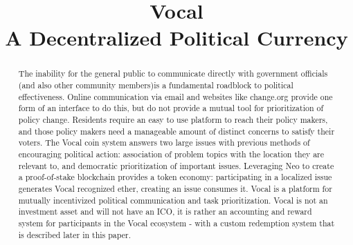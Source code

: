 \documentclass[conference]{IEEEtran}
\begin{document}
    \title{Vocal\\ A Decentralized Political Currency }
    
    \author{
    \and
    }

    \maketitle
    
    \begin{abstract}
      The inability for the general public to communicate directly with government officials (and also other community members)is a fundamental roadblock to political effectiveness. Online communication via email and websites like change.org provide one form of an interface to do this, but do not provide a mutual tool for prioritization of policy change. Residents require an easy to use platform to reach their policy makers, and those policy makers need a manageable amount of distinct concerns to satisfy their voters. The Vocal coin system answers two large issues with previous methods of encouraging political action: association of problem topics with the location they are relevant to, and democratic prioritization of important issues. Leveraging Neo to create a proof-of-stake blockchain provides a token economy: participating in a localized issue generates Vocal recognized ether, creating an issue consumes it. Vocal is a platform for mutually incentivized political communication and task prioritization. Vocal is not an investment asset and will not have an ICO, it is rather an accounting and reward system for participants in the Vocal ecosystem - with a custom redemption system that is described later in this paper.
    

    \end{abstract}
\end{document}
